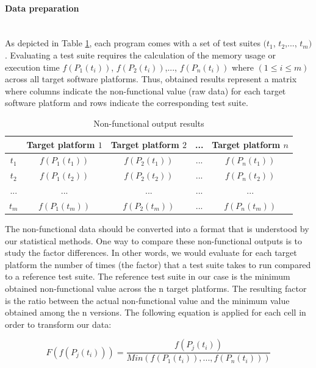 \paragraph{Data preparation}~\\ 
As depicted in Table \ref{tab:Non-functional output results}, each program comes with a set of test suites $(t_{1}$, $t_{2}$,..., $t_{m})$. Evaluating a test suite requires the calculation of the memory usage or execution time $f(P_{1}(t_{i}))$,  $f(P_{2}(t_{i}))$,..., $f(P_{n}(t_{i}))$ where $(1 \leq i \leq m)$  across all target software platforms. Thus, obtained results represent a matrix where columns indicate the non-functional value (raw data) for each target software platform and rows indicate the corresponding test suite.
\begin{table}[h]
	\centering
	
	\begin{tabular}{|c| c |c |c| c|}				
		\hline

		 &  Target platform $1$ &  Target platform $2$ & ... & Target platform $n$  \\ \hline
		$t_{1}$  &  $f(P_{1}(t_{1}))$ &  $f(P_{2}(t_{1}))$ & ... & $f(P_{n}(t_{1}))$  \\ \hline
		$t_{2}$ &  $f(P_{1}(t_{2}))$ &  $f(P_{2}(t_{2}))$ & ... & $f(P_{n}(t_{2}))$  \\ \hline
		... &  ... &  ... & ... & ...  \\ \hline
		$t_{m}$ &  $f(P_{1}(t_{m}))$ &  $f(P_{2}(t_{m}))$ & ... & $f(P_{n}(t_{m}))$  \\ \hline
	\end{tabular}
	
	\caption{Non-functional output results}
	\label{tab:Non-functional output results}
\end{table}
The non-functional data should be converted into a format that is understood by our statistical methods. One way to compare these non-functional outputs is to study the factor differences. In other words, we would evaluate for each target platform the number of times (the factor) that a test suite takes to run compared to a reference test suite. The reference test suite in our case is the minimum obtained non-functional value across the n target platforms. The resulting factor is the ratio between the actual non-functional value and the minimum value obtained among the n versions. The following equation is applied for each cell in order to transform our data:

\begin{equation}
F(f(P_{j}(t_{i})))=\frac{f(P_{j}(t_{i}))}{Min(f(P_{1}(t_{i})),..., f(P_{n}(t_{i})))}  
\end{equation}

